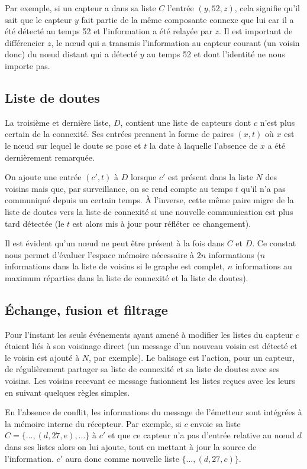 \documentclass[10pt]{article}
\begin{document}
\begin{multicols}{2}
Par exemple, si un capteur a dans sa liste $C$ l'entrée $(y,52,z)$,
cela signifie qu'il sait que le capteur $y$ fait partie de la même
composante connexe que lui car il a été détecté au temps 52 et
l'information a été relayée par $z$. Il est important de différencier
$z$, le n\oe ud qui a transmis l'information au capteur courant (un
voisin donc) du n\oe ud distant qui a détecté $y$ au temps 52 et dont
l'identité ne nous importe pas.

\subsection*{Liste de doutes}

La troisième et dernière liste, $D$, contient une liste de capteurs
dont $c$ n'est plus certain de la connexité. Ses entrées prennent la
forme de paires $(x,t)$ o\`u $x$ est le n\oe ud sur lequel le doute se
pose et $t$ la date à laquelle l'absence de $x$ a été dernièrement
remarquée.

On ajoute une entrée $(c',t)$ à $D$ lorsque $c'$ est présent dans la
liste $N$ des voisins mais que, par surveillance, on se rend compte au
temps $t$ qu'il n'a pas communiqué depuis un certain temps. \`A
l'inverse, cette même paire migre de la liste de doutes vers la liste
de connexité si une nouvelle communication est plus tard détectée (le
$t$ est alors mis à jour pour réfléter ce changement).

Il est évident qu'un n\oe ud ne peut être présent à la fois dans $C$
et $D$. Ce constat nous permet d'évaluer l'espace mémoire nécessaire à
$2n$ informations ($n$ informations dans la liste de voisins si le
graphe est complet, $n$ informations au maximum réparties dans la
liste de connexité et la liste de doutes).

\subsection*{\'Echange, fusion et filtrage}

Pour l'instant les seuls événements ayant amené à modifier les listes
du capteur $c$ étaient liés à son voisinage direct (un message d'un
nouveau voisin est détecté et le voisin est ajouté à $N$, par
exemple). Le balisage est l'action, pour un capteur, de régulièrement
partager sa liste de connexité et sa liste de doutes avec ses
voisins. Les voisins recevant ce message fusionnent les listes reçues
avec les leurs en suivant quelques règles simples.

En l'absence de conflit, les informations du message de l'émetteur
sont intégrées à la mémoire interne du récepteur. Par exemple, si $c$
envoie sa liste $C = \{\dots,(d,27,e),\dots\}$ à $c'$ et que ce capteur
n'a pas d'entrée relative au n\oe ud $d$ dans ses listes alors on lui
ajoute, tout en mettant à jour la source de l'information. $c'$ aura
donc comme nouvelle liste $\{\dots,(d,27,c)\}$.


\end{multicols}
\end{document}
